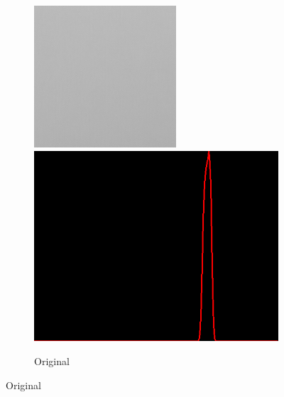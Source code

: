 \begin{figure}[H]
\begin{subfigure}[b]{0.28\textwidth}
        \begin{center}
        	\text{ }
        \end{center}
        \includegraphics[width=\textwidth]{img2/rect_eee_org_res_total.png}\\[0.1cm]
        \includegraphics[width=\textwidth]{img2/hist_rect_eee_org_res_total.png}
        \caption{Original}
        \label{fig:img2_org}
    \end{subfigure}

\end{figure}
